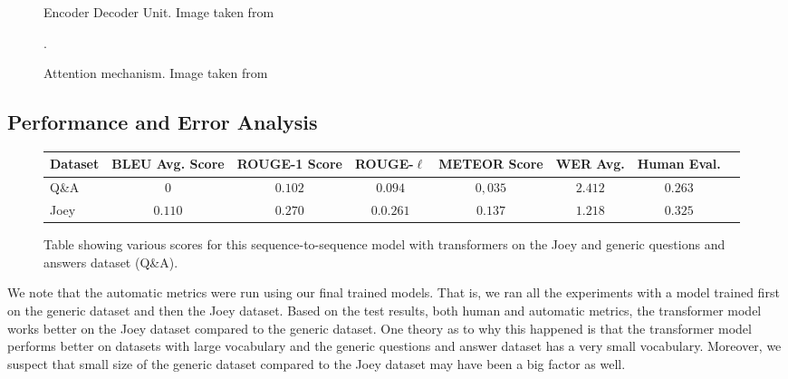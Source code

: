 \begin{figure}[ht]
  \centering
  \begin{minipage}[b]{0.40\textwidth}
    \begin{center}
	\end{center}
    \caption{Encoder Decoder Unit. Image taken from \cite{DBLP:journals/corr/VaswaniSPUJGKP17}}.
    \label{fig:trans_model}
  \end{minipage}
  \hfill
  \begin{minipage}[b]{0.40\textwidth}
    \begin{center}
	\end{center}
    \caption{Attention mechanism. Image taken from \cite{DBLP:journals/corr/VaswaniSPUJGKP17}}
    \label{fig:attention}
  \end{minipage}
\end{figure}

\subsection{Performance and Error Analysis}
\label{subsec:trans_s2s}
\begin{figure}[ht]
	\begin{center}
		\scalebox{.8}
		{
			\begin{tabular}{ |l|c|c|c|c|c|c|c| } 
				\hline
				\textbf{Dataset} & \textbf{BLEU Avg. Score} & \textbf{ROUGE-1 Score} & \textbf{ROUGE-$\ell$} & \textbf{METEOR Score} & \textbf{WER Avg.} & \textbf{Human Eval.}\\
				\hline
				Q\&A & $0$ & $0.102$ & $0.094$ & $0,035$ & $2.412$ & $0.263$\\
				\hline
				Joey & $0.110$ & $0.270$ & $0.0.261$ & $0.137$ & $1.218$ & $0.325$\\ 
				\hline
			\end{tabular}
		}
	\end{center}
	\caption{Table showing various scores for this sequence-to-sequence model with transformers on the Joey and generic questions and answers dataset (Q\&A).}
	\label{fig:trans_res}
\end{figure}
We note that the automatic metrics were run using our final trained models.
That is, we ran all the experiments  with a model trained first on the generic dataset and then the Joey dataset.
Based on the test results, both human and automatic metrics, the transformer model works better on the Joey dataset compared to the generic dataset.
One theory as to why this happened is that the transformer model performs better on datasets with large vocabulary and the generic questions and answer dataset has a very small vocabulary.
Moreover, we suspect that small size of the generic dataset compared to the Joey dataset may have been a big factor as well.

